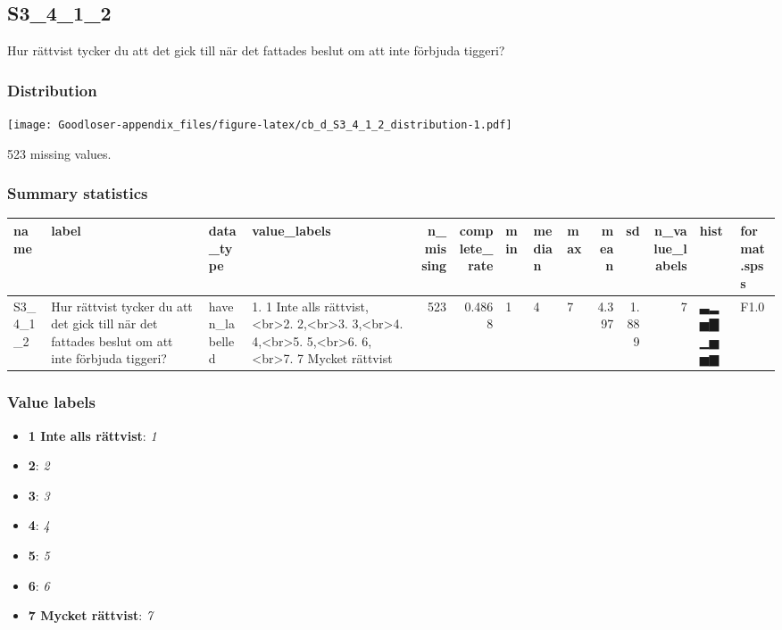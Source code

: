 \documentclass[
]{book}
\providecommand{\tightlist}{%
  \setlength{\itemsep}{0pt}\setlength{\parskip}{0pt}}
\begin{document}
\hypertarget{S3_4_1_2}{%
\subsection{S3\_4\_1\_2}\label{S3_4_1_2}}

Hur rättvist tycker du att det gick till när det fattades beslut om att inte förbjuda tiggeri?

\hypertarget{S3_4_1_2_distribution}{%
\subsubsection{Distribution}\label{S3_4_1_2_distribution}}

\texttt{[image: Goodloser-appendix\_files/figure-latex/cb\_d\_S3\_4\_1\_2\_distribution-1.pdf]}

523 missing values.

\hypertarget{S3_4_1_2_summary}{%
\subsubsection{Summary statistics}\label{S3_4_1_2_summary}}

\begin{tabular}{l|l|l|l|r|r|l|l|l|r|r|r|l|l}
\hline
name & label & data_type & value_labels & n_missing & complete_rate & min & median & max & mean & sd & n_value_labels & hist & format.spss\\
\hline
S3_4_1_2 & Hur rättvist tycker du att det gick till när det fattades beslut om att inte förbjuda tiggeri? & haven_labelled & 1. 1 Inte alls rättvist,<br>2. 2,<br>3. 3,<br>4. 4,<br>5. 5,<br>6. 6,<br>7. 7 Mycket rättvist & 523 & 0.4868 & 1 & 4 & 7 & 4.397 & 1.889 & 7 & ▃▂▅▇▁▅▅▆ & F1.0\\
\hline
\end{tabular}

\hypertarget{S3_4_1_2_labels}{%
\subsubsection{Value labels}\label{S3_4_1_2_labels}}

\begin{itemize}
\tightlist
\item
  \textbf{1 Inte alls rättvist}: \emph{1}
\item
  \textbf{2}: \emph{2}
\item
  \textbf{3}: \emph{3}
\item
  \textbf{4}: \emph{4}
\item
  \textbf{5}: \emph{5}
\item
  \textbf{6}: \emph{6}
\item
  \textbf{7 Mycket rättvist}: \emph{7}
\end{itemize}
\end{document}
